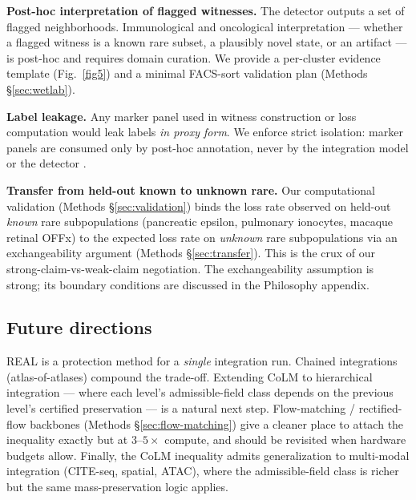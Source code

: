 \textbf{Post-hoc interpretation of flagged witnesses.} The detector outputs a set of flagged neighborhoods. Immunological and oncological interpretation --- whether a flagged witness is a known rare subset, a plausibly novel state, or an artifact --- is post-hoc and requires domain curation. We provide a per-cluster evidence template (Fig.~\ref{fig5}) and a minimal FACS-sort validation plan (Methods §\ref{sec:wetlab}).

\textbf{Label leakage.} Any marker panel used in witness construction or loss computation would leak labels \emph{in proxy form}. We enforce strict isolation: marker panels are consumed only by post-hoc annotation, never by the integration model or the detector \citep[Philosophy appendix \S]{pooled-epistemic-framing}.

\textbf{Transfer from held-out known to unknown rare.} Our computational validation (Methods §\ref{sec:validation}) binds the loss rate observed on held-out \emph{known} rare subpopulations (pancreatic epsilon, pulmonary ionocytes, macaque retinal OFFx) to the expected loss rate on \emph{unknown} rare subpopulations via an exchangeability argument (Methods §\ref{sec:transfer}). This is the crux of our strong-claim-vs-weak-claim negotiation. The exchangeability assumption is strong; its boundary conditions are discussed in the Philosophy appendix.

\subsection*{Future directions}

REAL is a protection method for a \emph{single} integration run. Chained integrations (atlas-of-atlases) compound the trade-off. Extending CoLM to hierarchical integration --- where each level's admissible-field class depends on the previous level's certified preservation --- is a natural next step. Flow-matching / rectified-flow backbones (Methods §\ref{sec:flow-matching}) give a cleaner place to attach the inequality exactly but at $3$--$5\times$ compute, and should be revisited when hardware budgets allow. Finally, the CoLM inequality admits generalization to multi-modal integration (CITE-seq, spatial, ATAC), where the admissible-field class is richer but the same mass-preservation logic applies.

